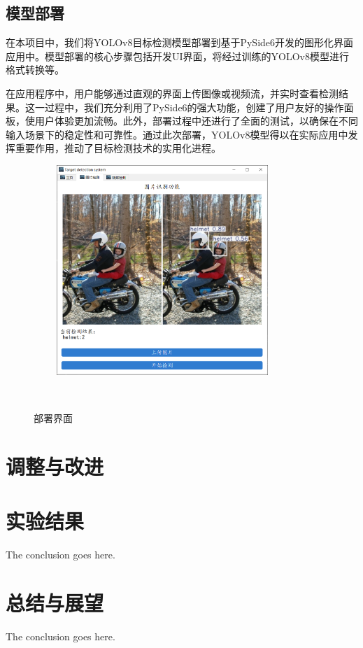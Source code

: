 \documentclass[journal]{IEEEtran}
\begin{document}
\subsection{模型部署}
在本项目中，我们将YOLOv8目标检测模型部署到基于PySide6开发的图形化界面应用中。模型部署的核心步骤包括开发UI界面，将经过训练的YOLOv8模型进行格式转换等。\par
在应用程序中，用户能够通过直观的界面上传图像或视频流，并实时查看检测结果。这一过程中，我们充分利用了PySide6的强大功能，创建了用户友好的操作面板，使用户体验更加流畅。此外，部署过程中还进行了全面的测试，以确保在不同输入场景下的稳定性和可靠性。通过此次部署，YOLOv8模型得以在实际应用中发挥重要作用，推动了目标检测技术的实用化进程。\par
\begin{figure}[htbp] 

   \centering
   \includegraphics[width=8cm]{figures/部署页面.png}
   \caption{部署界面} 
   \label{fig:} 
  
\end{figure} 

\section{调整与改进}


\section{实验结果}
The conclusion goes here.

\section{总结与展望}
The conclusion goes here.
\end{document}
